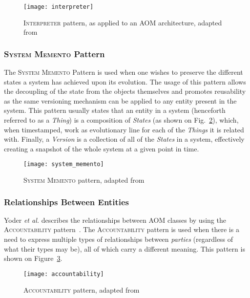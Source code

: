 \begin{figure}[H]
  \centering
  \texttt{[image: interpreter]}
  \caption{\textsc{Interpreter} pattern, as applied to an AOM architecture, adapted from \cite{gang_of_four}}
  \label{fig:interpreter_pattern}
\end{figure}

\subsubsection{\textsc{System Memento} Pattern}\label{sec:system_memento_pattern}

The \textsc{System Memento} Pattern is used when one wishes to preserve the different states a system has achieved upon its evolution. The usage of this pattern allows the decoupling of the state from the objects themselves and promotes reusability as the same versioning mechanism can be applied to any entity present in the system. This pattern usually states that an entity in a system (henceforth referred to as a \emph{Thing}) is a composition of \emph{States} (as shown on Fig.~\ref{fig:system_memento}), which, when timestamped, work as evolutionary line for each of the \emph{Things} it is related with. Finally, a \emph{Version} is a collection of all of the \emph{States} in a system, effectively creating a snapshot of the whole system at a given point in time.

\begin{figure}[H]
  \centering
  \texttt{[image: system\_memento]}
  \caption{\textsc{System Memento} pattern, adapted from \cite{patterns_data_and_metadata_evolution_in_aoms}}
  \label{fig:system_memento}
\end{figure}

\subsubsection{Relationships Between Entities}\label{sec:relationships_between_entities}

Yoder \textit{et al.}\cite{YJ02} describes the relationships between AOM classes by using the \textsc{Accountability} pattern~\cite{fowler, hay}. The \textsc{Accountability} pattern is used when there is a need to express multiple types of relationships between \emph{parties} (regardless of what their types may be), all of which carry a different meaning\cite{fowler_accountability}. This pattern is shown on Figure~\ref{fig:accountability}.

\begin{figure}[H]
  \centering
  \texttt{[image: accountability]}
  \caption{\textsc{Accountability} pattern, adapted from \cite{fowler_accountability}}
  \label{fig:accountability}
\end{figure}

